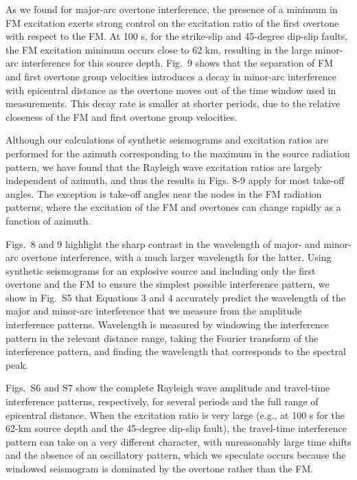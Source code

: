 \documentclass[extra,mreferee]{gji}
\begin{document}
As we found for major-arc overtone interference, the presence of a minimum in FM excitation exerts strong control on the excitation ratio of the first overtone with respect to the FM. At 100 s, for the strike-slip and 45-degree dip-slip faults, the FM excitation minimum occurs close to 62 km, resulting in the large minor-arc interference for this source depth. Fig.\ 9 shows that the separation of FM and first overtone group velocities introduces a decay in minor-arc interference with epicentral distance as the overtone moves out of the time window used in measurements. This decay rate is smaller at shorter periods, due to the relative closeness of the FM and first overtone group velocities.

Although our calculations of synthetic seismograms and excitation ratios are performed for the azimuth corresponding to the maximum in the source radiation pattern, we have found that the Rayleigh wave excitation ratios are largely independent of azimuth, and thus the results in Figs. 8-9 apply for most take-off angles. The exception is take-off angles near the nodes in the FM radiation patterns, where the excitation of the FM and overtones can change rapidly as a function of azimuth.

Figs.\ 8 and 9 highlight the sharp contrast in the wavelength of major- and minor-arc overtone interference, with a much larger wavelength for the latter. Using synthetic seismograms for an explosive source and including only the first overtone and the FM to ensure the simplest possible interference pattern, we show in Fig.\ S5 that Equations 3 and 4 accurately predict the wavelength of the major and minor-arc interference that we measure from the amplitude interference patterns. Wavelength is measured by windowing the interference pattern in the relevant distance range, taking the Fourier transform of the interference pattern, and finding the wavelength that corresponds to the spectral peak. 

Figs.\ S6 and S7 show the complete Rayleigh wave amplitude and travel-time interference patterns, respectively, for several periods and the full range of epicentral distance. When the excitation ratio is very large (e.g., at 100 s for the 62-km source depth and the 45-degree dip-slip fault), the travel-time interference pattern can take on a very different character, with unreasonably large time shifts and the absence of an oscillatory pattern, which we speculate occurs because the windowed seismogram is dominated by the overtone rather than the FM.
\end{document}
